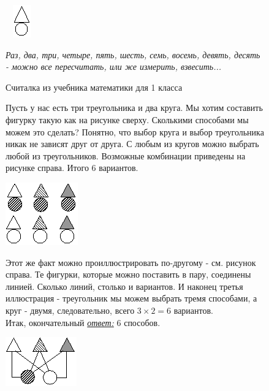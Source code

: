
\begin{figure}[h!]
\begin{minipage}{0.45\linewidth}~\hfill
    \includegraphics[scale=6]{./img/tr}
	\hfill~
\end{minipage}
\begin{minipage}{0.5\linewidth}\setlength{\parindent}{1.5em}
\epigraph{\textit{Раз, два, три, четыре, пять, шесть, семь, восемь, девять, десять -
		можно все пересчитать, или же измерить, взвесить...
}}{Считалка из учебника математики для 1 класса}
\end{minipage}
\end{figure}

\begin{figure}[h!]
\begin{minipage}{0.84\linewidth}\setlength{\parindent}{1.5em}
Пусть у нас есть три треугольника и два круга. Мы хотим составить фигурку такую как на рисунке сверху. Сколькими способами мы можем это сделать? Понятно, что выбор круга и выбор треугольника никак не зависят друг от друга. С любым из кругов можно выбрать любой из треугольников. Возможные комбинации приведены на рисунке справа. Итого 6 вариантов. 
\end{minipage}
\begin{minipage}{0.15\linewidth}
    \includegraphics[scale=5]{./img/tre}
\end{minipage}
\end{figure}

\begin{figure}[h!]
\begin{minipage}{0.84\linewidth}\setlength{\parindent}{1.5em}
Этот же факт можно проиллюстрировать по-другому - см. рисунок справа. Те фигурки, которые можно поставить в пару, соединены линией. Сколько линий, столько и вариантов. И наконец третья иллюстрация - треугольник мы можем выбрать тремя способами, а круг - двумя, следовательно, всего $3 \times 2 = 6$ вариантов.\\ Итак, окончательный \underline{\textit{ответ:}} 6 способов.
\end{minipage}
\begin{minipage}{0.15\linewidth}
    \includegraphics[scale=5]{./img/komb}
\end{minipage}
\end{figure}

